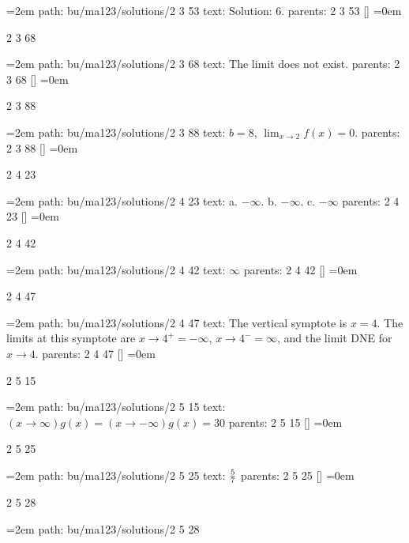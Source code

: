 \leftskip=2em
path: bu/ma123/solutions/2 3 53
\smallskip
text:  Solution: $6$.
\smallskip
parents:  2 3 53 []
\smallskip
\leftskip=0em
\par\endgroup
\bigskip
{}
2 3 68
\smallskip
\par\begingroup
\leftskip=2em
path: bu/ma123/solutions/2 3 68
\smallskip
text:  The limit does not exist.
\smallskip
parents:  2 3 68 []
\smallskip
\leftskip=0em
\par\endgroup
\bigskip
{}
2 3 88
\smallskip
\par\begingroup
\leftskip=2em
path: bu/ma123/solutions/2 3 88
\smallskip
text:  $b = 8$, $\lim_{x \to 2} f(x) = 0$.
\smallskip
parents:  2 3 88 []
\smallskip
\leftskip=0em
\par\endgroup
\bigskip
{}
2 4 23
\smallskip
\par\begingroup
\leftskip=2em
path: bu/ma123/solutions/2 4 23
\smallskip
text:  a. $-\infty$. b. $-\infty$. c. $-\infty$
\smallskip
parents:  2 4 23 []
\smallskip
\leftskip=0em
\par\endgroup
\bigskip
{}
2 4 42
\smallskip
\par\begingroup
\leftskip=2em
path: bu/ma123/solutions/2 4 42
\smallskip
text:  $\infty$
\smallskip
parents:  2 4 42 []
\smallskip
\leftskip=0em
\par\endgroup
\bigskip
{}
2 4 47
\smallskip
\par\begingroup
\leftskip=2em
path: bu/ma123/solutions/2 4 47
\smallskip
text:  The vertical symptote is $x = 4$. The limits at this symptote are $x \to 4^{+} = -\infty$, $x \to 4^{-} = \infty$, and the limit DNE for $x \to 4$.
\smallskip
parents:  2 4 47 []
\smallskip
\leftskip=0em
\par\endgroup
\bigskip
{}
2 5 15
\smallskip
\par\begingroup
\leftskip=2em
path: bu/ma123/solutions/2 5 15
\smallskip
text:  $({x \to \infty}){ g(x)} = ({x \to -\infty}) g(x) = 30$
\smallskip
parents:  2 5 15 []
\smallskip
\leftskip=0em
\par\endgroup
\bigskip
{}
2 5 25
\smallskip
\par\begingroup
\leftskip=2em
path: bu/ma123/solutions/2 5 25
\smallskip
text:  ${5 \over 7}$
\smallskip
parents:  2 5 25 []
\smallskip
\leftskip=0em
\par\endgroup
\bigskip
{}
2 5 28
\smallskip
\par\begingroup
\leftskip=2em
path: bu/ma123/solutions/2 5 28
